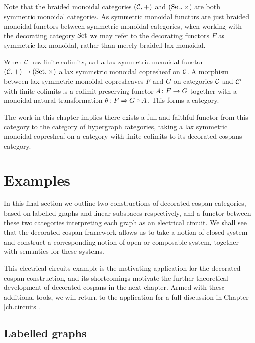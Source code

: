 \begin{remark}
Note that the braided monoidal categories $(\mathcal C,+)$ and $(\mathrm{Set},\times)$ are
both symmetric monoidal categories. As symmetric monoidal functors are just
braided monoidal functors between symmetric monoidal categories, when working
with the decorating category $\mathrm{Set}$ we may refer to the decorating functors $F$
as symmetric lax monoidal, rather than merely braided lax monoidal.
\end{remark}

\begin{remark}
  When $\mathcal C$ has finite colimits, call a lax symmetric monoidal functor $(\mathcal
  C,+) \to (\mathrm{Set},\times)$ a lax symmetric monoidal copresheaf on $\mathcal C$. A
  morphism between lax symmetric monoidal copresheaves $F$ and $G$ on categories
  $\mathcal C$ and $\mathcal C'$ with finite colimits is a colimit preserving functor $A
  {\colon} F \to G$ together with a monoidal natural transformation $\theta{\colon} F
  \Rightarrow G \circ A$. This forms a category.

  The work in this chapter implies there exists a full and faithful functor from
  this category to the category of hypergraph categories, taking a lax symmetric
  monoidal copresheaf on a category with finite colimits to its decorated cospans
  category.
\end{remark}

\section{Examples} \label{sec:ex}
In this final section we outline two constructions of decorated cospan
categories, based on labelled graphs and linear subspaces respectively, and a
functor between these two categories interpreting each graph as an electrical
circuit. We shall see that the decorated cospan framework allows us to take a
notion of closed system and construct a corresponding notion of open or
composable system, together with semantics for these systems. 

This electrical circuits example is the motivating application for the
decorated cospan construction, and its shortcomings motivate the further
theoretical development of decorated cospans in the next chapter. Armed with
these additional tools, we will return to the application for a full discussion
in Chapter \ref{ch.circuits}.

\subsection{Labelled graphs} \label{ssec.exlabelledgraphs}

